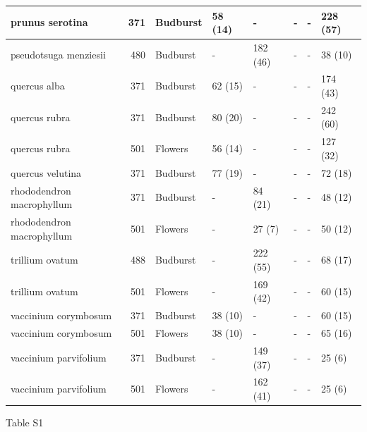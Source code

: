 \documentclass[a4paper,12pt]{article}
\begin{document}
\begin{table}
\begin{tabular}{l|r|l|l|l|l|l|l}
\hline
prunus serotina & 371 & Budburst & 58 (14) & - & - & - & 228 (57)\\
\hline
pseudotsuga menziesii & 480 & Budburst & - & 182 (46) & - & - & 38 (10)\\
\hline
quercus alba & 371 & Budburst & 62 (15) & - & - & - & 174 (43)\\
\hline
quercus rubra & 371 & Budburst & 80 (20) & - & - & - & 242 (60)\\
\hline
quercus rubra & 501 & Flowers & 56 (14) & - & - & - & 127 (32)\\
\hline
quercus velutina & 371 & Budburst & 77 (19) & - & - & - & 72 (18)\\
\hline
rhododendron macrophyllum & 371 & Budburst & - & 84 (21) & - & - & 48 (12)\\
\hline
rhododendron macrophyllum & 501 & Flowers & - & 27 (7) & - & - & 50 (12)\\
\hline
trillium ovatum & 488 & Budburst & - & 222 (55) & - & - & 68 (17)\\
\hline
trillium ovatum & 501 & Flowers & - & 169 (42) & - & - & 60 (15)\\
\hline
vaccinium corymbosum & 371 & Budburst & 38 (10) & - & - & - & 60 (15)\\
\hline
vaccinium corymbosum & 501 & Flowers & 38 (10) & - & - & - & 65 (16)\\
\hline
vaccinium parvifolium & 371 & Budburst & - & 149 (37) & - & - & 25 (6)\\
\hline
vaccinium parvifolium & 501 & Flowers & - & 162 (41) & - & - & 25 (6)\\
\hline
\end{tabular}
\newline
Table S1
\end{table}
\end{document}
